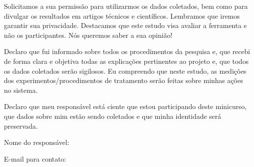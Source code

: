 Solicitamos a sua permissão para utilizarmos os dados coletados, bem como para divulgar os resultados em artigos técnicos e científicos. Lembramos que iremos garantir sua privacidade.
Destacamos que este estudo visa avaliar a ferramenta e não os participantes. Nós queremos saber a sua opinião!

\begin{todolist}
\item Declaro que fui informado sobre todos os procedimentos da pesquisa e, que recebi de forma clara e objetiva todas as explicações pertinentes ao projeto e, que todos os dados coletados serão sigilosos. Eu compreendo que neste estudo, as medições dos experimentos/procedimentos de tratamento serão feitas sobre minhas ações no sistema.
\item Declaro que meu responsável está ciente que estou participando deste minicurso, que dados sobre mim estão sendo coletados e que minha identidade será preservada.
\end{todolist}

Nome do responsável:

E-mail para contato:


